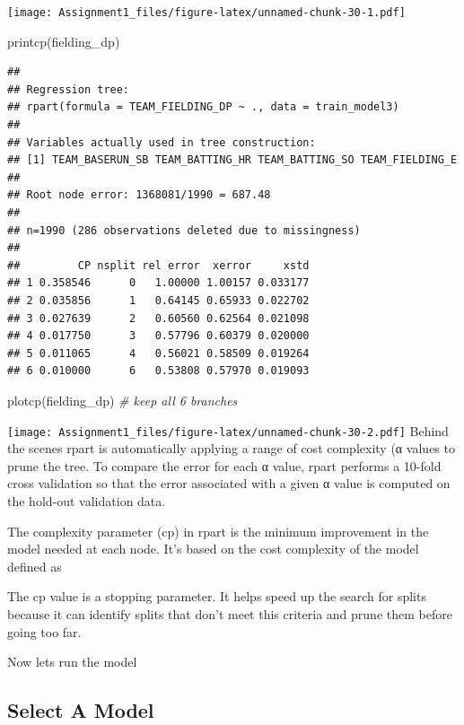 \documentclass[
]{article}
\newenvironment{Shaded}{\begin{snugshade}}{\end{snugshade}}
\newcommand{\CommentTok}[1]{\textcolor[rgb]{0.56,0.35,0.01}{\textit{#1}}}
\newcommand{\FunctionTok}[1]{\textcolor[rgb]{0.00,0.00,0.00}{#1}}
\newcommand{\NormalTok}[1]{#1}
\begin{document}
\texttt{[image: Assignment1\_files/figure-latex/unnamed-chunk-30-1.pdf]}

\begin{Shaded}
\begin{Highlighting}[]
\FunctionTok{printcp}\NormalTok{(fielding\_dp)}
\end{Highlighting}
\end{Shaded}

\begin{verbatim}
## 
## Regression tree:
## rpart(formula = TEAM_FIELDING_DP ~ ., data = train_model3)
## 
## Variables actually used in tree construction:
## [1] TEAM_BASERUN_SB TEAM_BATTING_HR TEAM_BATTING_SO TEAM_FIELDING_E
## 
## Root node error: 1368081/1990 = 687.48
## 
## n=1990 (286 observations deleted due to missingness)
## 
##         CP nsplit rel error  xerror     xstd
## 1 0.358546      0   1.00000 1.00157 0.033177
## 2 0.035856      1   0.64145 0.65933 0.022702
## 3 0.027639      2   0.60560 0.62564 0.021098
## 4 0.017750      3   0.57796 0.60379 0.020000
## 5 0.011065      4   0.56021 0.58509 0.019264
## 6 0.010000      6   0.53808 0.57970 0.019093
\end{verbatim}

\begin{Shaded}
\begin{Highlighting}[]
\FunctionTok{plotcp}\NormalTok{(fielding\_dp) }\CommentTok{\# keep all 6 branches}
\end{Highlighting}
\end{Shaded}

\texttt{[image: Assignment1\_files/figure-latex/unnamed-chunk-30-2.pdf]}
Behind the scenes rpart is automatically applying a range of cost
complexity (α values to prune the tree. To compare the error for each α
value, rpart performs a 10-fold cross validation so that the error
associated with a given α value is computed on the hold-out validation
data.

The complexity parameter (cp) in rpart is the minimum improvement in the
model needed at each node. It's based on the cost complexity of the
model defined as

The cp value is a stopping parameter. It helps speed up the search for
splits because it can identify splits that don't meet this criteria and
prune them before going too far.

Now lets run the model

\hypertarget{select-a-model}{%
\subsection{Select A Model}\label{select-a-model}}
\end{document}
